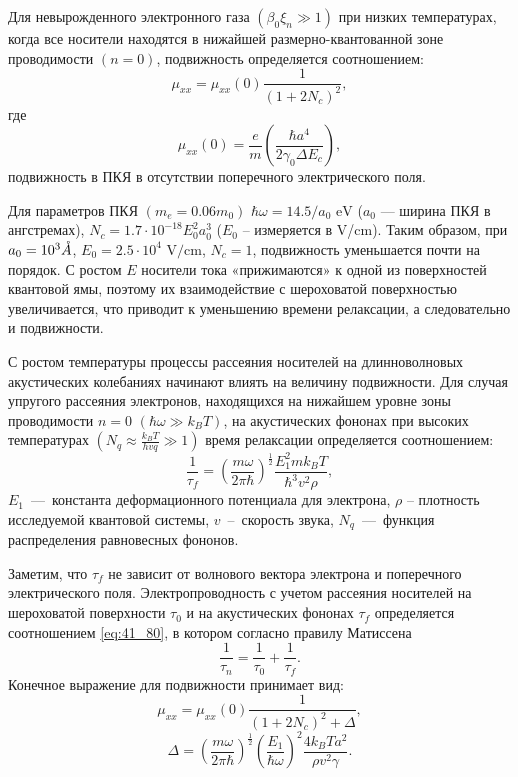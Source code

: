 Для невырожденного электронного газа $(\beta _{0} \xi _{n} \gg 1)$ при низких температурах, когда все носители находятся в нижайшей размерно-квантованной зоне проводимости $(n=0)$, подвижность определяется соотношением:
\begin{equation} \label{eq:41_90}
\mu _{xx} =\mu _{xx} (0)\frac{1}{\left(1+2 N_c \right)^2 } , 
\end{equation}
где
\[
\mu _{xx} (0)=\frac{e}{m} \left(\frac{\hbar a^4 }{2\gamma_0 \Delta E_c } \right),
\] 
подвижность в ПКЯ в отсутствии поперечного электрического поля.

Для параметров ПКЯ $(m_e = 0.06 m_0 )$ $\hbar \omega = 14.5/a_0 \text{ eV}$ ($a_0 $ --- ширина ПКЯ в ангстремах), $N_c =1.7\cdot 10^{-18} E_0^2 a_0^3 $ ($E_0 $ -- измеряется в V/cm). Таким образом, при $a_0 = 10^3 \AA$, $E_0 = 2.5\cdot 10^4 \text{ V/cm}$, $N_c =1$, подвижность уменьшается почти на порядок. С ростом $E$ носители тока «прижимаются» к одной из поверхностей квантовой ямы, поэтому их взаимодействие с шероховатой поверхностью увеличивается, что приводит к уменьшению времени релаксации, а следовательно и подвижности.

С ростом температуры процессы рассеяния носителей на длинноволновых акустических колебаниях начинают влиять на величину подвижности. Для случая упругого рассеяния электронов, находящихся на нижайшем уровне зоны проводимости $n=0$ $(\hbar \omega \gg k_B T)$, на акустических фононах при высоких температурах $(N_q \approx \frac{k_BT}{hvq} \gg 1)$ время релаксации определяется соотношением:
\begin{equation} \label{eq:41_100}
\frac{1}{\tau _{f} } =\left(\frac{m\omega }{2\pi \hbar } \right)^{\frac{1}{2} } \frac{E_1^2 m k_B T}{\hbar^3 v^2 \rho } , 
\end{equation} 
$E_1 $~---~константа деформационного потенциала для электрона, $\rho $ -- плотность исследуемой квантовой системы, $v$~--~скорость звука, $N_q $~---~функция распределения равновесных фононов.

Заметим, что $\tau_f $ не зависит от волнового вектора электрона и поперечного электрического поля. Электропроводность с учетом рассеяния носителей на шероховатой поверхности $\tau_0 $ и на акустических фононах $\tau_f $ определяется соотношением \eqref{eq:41_80}, в котором согласно правилу Матиссена
\[
\frac{1}{\tau_n } =\frac{1}{\tau_0 } +\frac{1}{\tau_f } .
\]
Конечное выражение для подвижности принимает вид:
\begin{equation} \label{eq:41_110}
\mu _{xx} =\mu _{xx} (0)\frac{1}{\left(1+2N_{c} \right)^{2} +\Delta } , 
\end{equation} 
\[
\Delta =\left(\frac{m\omega }{2\pi \hbar } \right)^{\frac{1}{2} } \left(\frac{E_1 }{\hbar \omega } \right)^2 \frac{4k_B T a^2 }{\rho v^2 \gamma }. 
\] 

